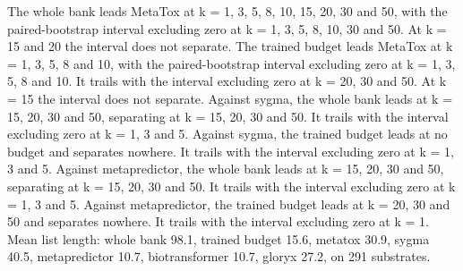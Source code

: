The whole bank leads MetaTox at k = 1, 3, 5, 8, 10, 15, 20, 30 and 50, with the paired-bootstrap interval excluding zero at k = 1, 3, 5, 8, 10, 30 and 50. At k = 15 and 20 the interval does not separate.
The trained budget leads MetaTox at k = 1, 3, 5, 8 and 10, with the paired-bootstrap interval excluding zero at k = 1, 3, 5, 8 and 10. It trails with the interval excluding zero at k = 20, 30 and 50. At k = 15 the interval does not separate.
Against sygma, the whole bank leads at k = 15, 20, 30 and 50, separating at k = 15, 20, 30 and 50. It trails with the interval excluding zero at k = 1, 3 and 5.
Against sygma, the trained budget leads at no budget and separates nowhere. It trails with the interval excluding zero at k = 1, 3 and 5.
Against metapredictor, the whole bank leads at k = 15, 20, 30 and 50, separating at k = 15, 20, 30 and 50. It trails with the interval excluding zero at k = 1, 3 and 5.
Against metapredictor, the trained budget leads at k = 20, 30 and 50 and separates nowhere. It trails with the interval excluding zero at k = 1.
Mean list length: whole bank 98.1, trained budget 15.6, metatox 30.9, sygma 40.5, metapredictor 10.7, biotransformer 10.7, gloryx 27.2, on 291 substrates.
